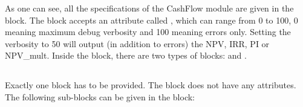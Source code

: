 As one can see, all the specifications of the CashFlow module are given in the  block. The block accepts an attribute called ,
which can range from 0 to 100, 0 meaning maximum debug verbosity and 100 meaning errors only. Setting the verbosity to 50 will output (in addition to errors) the NPV, IRR, PI or NPV\_mult. Inside the  block, there are two types of blocks:  and .

\subsection{}
Exactly one  block has to be provided. The  block does not have any attributes. The following sub-blocks can be given in the  block:

